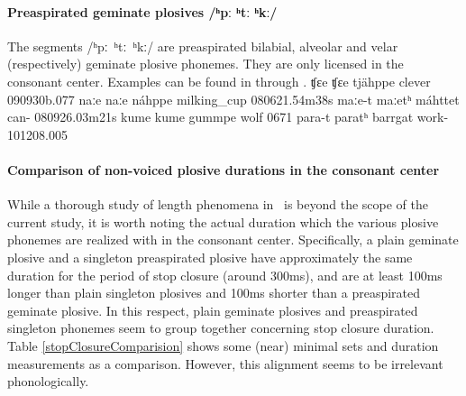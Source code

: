 \paragraph{Preaspirated geminate plosives /ʰpː ʰtː ʰkː/}
The segments \mbox{/ʰpː ʰtː ʰkː/} are preaspirated bilabial, alveolar and velar (respectively) geminate plosive phonemes. 
They are only licensed in the consonant center. %
Examples can be found in  through .
		{ʧɛe}		{ʧɛe}		{tjähppe}	{clever\BS{}}		{090930b}{.077}
	{naːe}	{naːe}	{náhppe}	{milking\_cup\BS{}}	{080621}{.54m38s}
			{maːe-t}	{maːetʰ}	{máhttet}	{can-}			{080926}{.03m21s}
			{kume}	{kume}	{gummpe}	{wolf\BS{}}		{0671}
			{para-t}	{paratʰ}	{barrgat}	{work-}			{101208}{.005}


\paragraph[Non-voiced plosive durations in the consonant center]{Comparison of non-voiced plosive durations in the consonant center}\label{plosiveDurationComparison}
While a thorough study of length phenomena in \PS\ is beyond the scope of the current study, it is worth noting the actual duration which the various plosive phonemes are realized with in the consonant center. %
Specifically, %
a plain geminate plosive and a singleton preaspirated plosive have approximately the same duration for the period of stop closure (around 300ms), and are at least 100ms longer than plain singleton plosives and 100ms shorter than a preaspirated geminate plosive. In this respect, plain geminate plosives and preaspirated singleton phonemes seem to group together concerning stop closure duration. 
Table \vref{stopClosureComparision} %
shows some (near) minimal sets and duration measurements as a comparison. However, this alignment seems to be irrelevant phonologically. 

